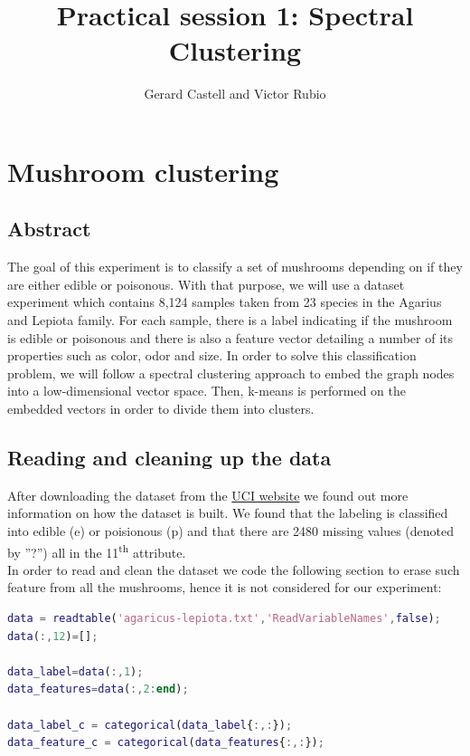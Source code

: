 \documentclass[12pt]{article}
\title{Practical session 1: Spectral Clustering}
\author{Gerard Castell and Victor Rubio}
\begin{document}
\maketitle

\thispagestyle{fancyplain}
\flushleft 


\Large
\hspace{10pt}
\small
\section{Mushroom clustering}

\subsection{Abstract}
\justifying
The goal of this experiment is to classify a set of mushrooms depending on if they are either edible or poisonous. With that purpose, we will use a dataset experiment which contains 8,124 samples taken from 23 species in the Agarius and Lepiota family. For each sample, there is a label indicating if the mushroom is edible or poisonous and there is also a feature vector detailing a number of its properties such as color, odor and size. In order to solve this classification problem, we will follow a spectral clustering approach to embed the graph nodes into a low-dimensional vector space. Then, k-means is performed on the embedded vectors in order to divide them into clusters.
\subsection{Reading and cleaning up the data}
\justifying
After downloading the dataset from the \href{https://archive.ics.uci.edu/ml/datasets/mushroom}{UCI website} we found out more information on how the dataset is built. We found that the labeling is classified into edible (e) or poisionous (p) and that there are 2480 missing values (denoted by ''?'') all in the 11\textsuperscript{th} attribute.\\

In order to read and clean the dataset we code the following section to erase such feature from all the mushrooms, hence it is not considered for our experiment:
\smallskip
\begin{lstlisting}[language=matlab]
data = readtable('agaricus-lepiota.txt','ReadVariableNames',false);
data(:,12)=[];

data_label=data(:,1);
data_features=data(:,2:end);

data_label_c = categorical(data_label{:,:});
data_feature_c = categorical(data_features{:,:});
\end{lstlisting}
\end{document}
